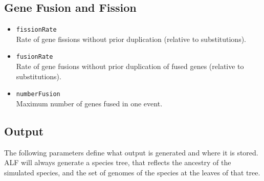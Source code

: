 \documentclass[11pt]{article}
\begin{document}
\subsection{Gene Fusion and Fission}
\begin{itemize}
\item{\texttt{fissionRate}} \hfill \\
Rate of gene fissions without prior duplication (relative to substitutions).
\item{\texttt{fusionRate}} \hfill \\
Rate of gene fusions without prior duplication of fused genes (relative to substitutions).
\item{\texttt{numberFusion}} \hfill \\
Maximum number of genes fused in one event.
\end{itemize}

\subsection{Output}
The following parameters define what output is generated and where it is stored. ALF will always generate a species tree, that reflects the ancestry of the simulated species, and the set of genomes of the species at the leaves of that tree.
\end{document}
